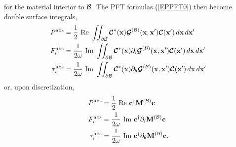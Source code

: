 for the material interior to $\mathcal{B}$. The PFT formulas (\ref{EPPFT0}) 
then become double surface integrals,
\begin{subequations}
\begin{align}
 P^{\hbox{\scriptsize{abs}}} 
     &= \frac{1}{2}\text{ Re }
      \iint_{\partial \mathcal{B}} 
      \boldsymbol{\mathcal{C}}^*(\mathbf{x}) \boldsymbol{\mathcal{G}}^{(\mathcal{B})}(\mathbf{x}, \mathbf{x}^\prime)
      \boldsymbol{\mathcal{C}}(\mathbf{x}^\prime)
      \,d\mathbf{x}\, d\mathbf{x}^\prime
\\
 F_i^{\hbox{\scriptsize{abs}}} 
     &= \frac{1}{2\omega}\text{ Im }
      \iint_{\partial \mathcal{B}}
      \boldsymbol{\mathcal{C}}^*(\mathbf{x}) \partial_i \boldsymbol{\mathcal{G}}^{(\mathcal{B})}(\mathbf{x}, \mathbf{x}^\prime)
      \boldsymbol{\mathcal{C}}(\mathbf{x}^\prime)
      \,d\mathbf{x} \,d\mathbf{x}^\prime
\\
 \tau_i^{\hbox{\scriptsize{abs}}} 
     &= \frac{1}{2\omega}\text{ Im }
      \iint_{\partial \mathcal{B}}
      \boldsymbol{\mathcal{C}}^*(\mathbf{x}) \partial_\theta \boldsymbol{\mathcal{G}}^{(\mathcal{B})}(\mathbf{x}, \mathbf{x}^\prime)
      \boldsymbol{\mathcal{C}}(\mathbf{x}^\prime)
      \,d\mathbf{x}\, d\mathbf{x}^\prime
\end{align}
\label{EPPFT1}
\end{subequations}
or, upon discretization,
\begin{subequations}
\begin{align}
 P^{\hbox{\scriptsize{abs}}} 
     &= \frac{1}{2}\text{ Re }
      \mathbf{c}^\dagger \mathbf{M}^{(\mathcal{B})} \mathbf{c}
\\
 F_i^{\hbox{\scriptsize{abs}}} 
     &= \frac{1}{2\omega}\text{ Im }
      \mathbf{c}^\dagger \partial_i \mathbf{M}^{(\mathcal{B})} \mathbf{c}
\\
 \tau_i^{\hbox{\scriptsize{abs}}} 
     &= \frac{1}{2\omega}\text{ Im }
      \mathbf{c}^\dagger \partial_\theta \mathbf{M}^{(\mathcal{B})} \mathbf{c}.
\end{align}
\label{EPPFT}
\end{subequations}

